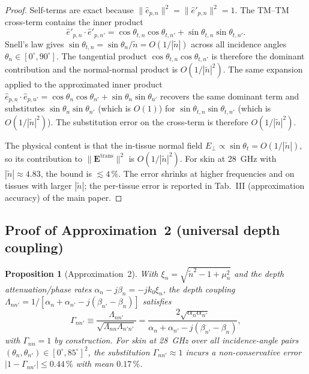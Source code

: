 \documentclass[10pt,journal,twocolumn]{IEEEtran}
\newcommand{\ntilde}{\tilde{n}}
\theoremstyle{plain}
\newtheorem{proposition}{Proposition}[section]
\theoremstyle{definition}
\begin{document}
\begin{proof}
Self-terms are exact because $\|\hat{e}_{p,n}\|^2 =
\|\hat{e}'_{p,n}\|^2 = 1$. The TM--TM cross-term contains the inner
product
\begin{equation}\label{eq:eppdot}
  \hat{e}'_{p,n} \cdot \hat{e}'_{p,n'}
  = \cos\theta_{t,n}\cos\theta_{t,n'}
  + \sin\theta_{t,n}\sin\theta_{t,n'}.
\end{equation}
Snell's law gives $\sin\theta_{t,n} = \sin\theta_n / \ntilde =
O(1/|\ntilde|)$ across all incidence angles
$\theta_n \in [0^{\circ}, 90^{\circ}]$. The tangential product
$\cos\theta_{t,n}\cos\theta_{t,n'}$ is therefore the dominant
contribution and the normal-normal product is $O(1/|\ntilde|^2)$.
The same expansion applied to the approximated inner product
$\hat{e}_{p,n} \cdot \hat{e}_{p,n'} = \cos\theta_n\cos\theta_{n'}
+ \sin\theta_n\sin\theta_{n'}$ recovers the same dominant term and
substitutes $\sin\theta_n\sin\theta_{n'}$ (which is $O(1)$) for
$\sin\theta_{t,n}\sin\theta_{t,n'}$ (which is $O(1/|\ntilde|^2)$).
The substitution error on the cross-term is therefore
$O(1/|\ntilde|^2)$.

The physical content is that the in-tissue normal field
$E_\perp \propto \sin\theta_t = O(1/|\ntilde|)$, so its contribution
to $\|\bm{E}^{\mathrm{trans}}\|^2$ is $O(1/|\ntilde|^2)$. For skin
at 28~GHz with $|\ntilde| \approx 4.83$, the bound is
$\lesssim 4\,\%$. The error shrinks at higher frequencies and on
tissues with larger $|\ntilde|$;
the per-tissue error is reported in Tab.~III (approximation accuracy)
of the main paper.
\end{proof}

\subsection{Proof of Approximation~2 (universal depth coupling)}

\begin{proposition}[Approximation~2]\label{prop:S-approx2}
With $\xi_n = \sqrt{\ntilde^2 - 1 + \mu_n^2}$ and the depth
attenuation/phase rates $\alpha_n - j\beta_n = -j k_0 \xi_n$, the
depth coupling
$\Lambda_{nn'} = 1 / [\alpha_n + \alpha_{n'} - j(\beta_{n'} - \beta_n)]$
satisfies
\begin{equation}\label{eq:Gamma-norm}
  \Gamma_{nn'}
    \equiv \frac{\Lambda_{nn'}}{\sqrt{\Lambda_{nn}\Lambda_{n'n'}}}
    = \frac{2\sqrt{\alpha_n \alpha_{n'}}}
           {\alpha_n + \alpha_{n'} - j(\beta_{n'} - \beta_n)},
\end{equation}
with $\Gamma_{nn} = 1$ by construction. For skin at 28~GHz over all
incidence-angle pairs $(\theta_n, \theta_{n'}) \in
[0^{\circ}, 85^{\circ}]^2$, the substitution $\Gamma_{nn'} \approx 1$
incurs a non-conservative error $|1 - \Gamma_{nn'}| \leq 0.44\,\%$
with mean $0.17\,\%$.
\end{proposition}
\end{document}
